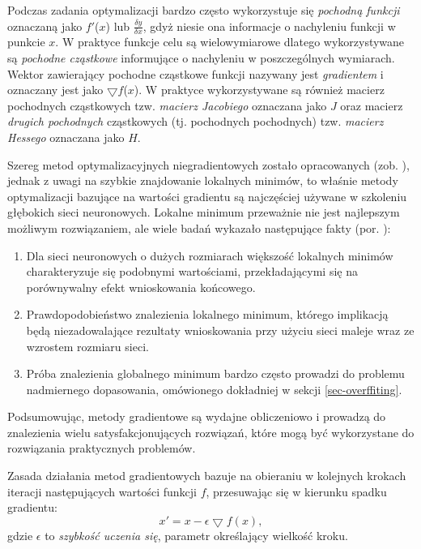 Podczas zadania optymalizacji bardzo często wykorzystuje się \textit{pochodną funkcji} oznaczaną jako $f'$($x$) lub $\frac{\delta y}{\delta x}$, gdyż niesie ona informacje o nachyleniu funkcji w punkcie $x$. W praktyce funkcje celu są wielowymiarowe dlatego wykorzystywane są \textit{pochodne cząstkowe} informujące o nachyleniu w poszczególnych wymiarach. Wektor zawierający pochodne cząstkowe funkcji nazywany jest \textit{gradientem} i oznaczany jest jako $\bigtriangledown f$($x$). W praktyce wykorzystywane są również macierz pochodnych cząstkowych tzw. \textit{macierz Jacobiego} oznaczana jako $J$ oraz macierz \textit{drugich pochodnych} cząstkowych (tj. pochodnych pochodnych) tzw. \textit{macierz Hessego} oznaczana jako $H$.

Szereg metod optymalizacyjnych niegradientowych zostało opracowanych (zob. \cite{DBLP:journals/corr/TaylorBXSPG16}), jednak z uwagi na szybkie znajdowanie lokalnych minimów, to właśnie metody optymalizacji bazujące na wartości gradientu są najczęściej używane w szkoleniu głębokich sieci neuronowych. Lokalne minimum przeważnie nie jest najlepszym możliwym rozwiązaniem, ale wiele badań wykazało następujące fakty (por. \cite{DBLP:journals/corr/ChoromanskaHMAL14}):
\begin{enumerate}
	\item Dla sieci neuronowych o dużych rozmiarach większość lokalnych minimów charakteryzuje się podobnymi wartościami, przekładającymi się na porównywalny efekt wnioskowania końcowego.
	\item Prawdopodobieństwo znalezienia lokalnego minimum, którego implikacją będą niezadowalające rezultaty wnioskowania przy użyciu sieci maleje wraz ze wzrostem rozmiaru sieci.
	\item Próba znalezienia globalnego minimum bardzo często prowadzi do problemu nadmiernego dopasowania, omówionego dokładniej w sekcji \ref{sec-overffiting}.
\end{enumerate}

Podsumowując, metody gradientowe są wydajne obliczeniowo i prowadzą do znalezienia wielu satysfakcjonujących rozwiązań, które mogą być wykorzystane do rozwiązania praktycznych problemów. 

Zasada działania metod gradientowych bazuje na obieraniu w kolejnych krokach iteracji następujących wartości funkcji $f$, przesuwając się w kierunku spadku gradientu:
\begin{equation}
x' = x - \epsilon \bigtriangledown f(x),
\end{equation} 
gdzie $\epsilon$ to \textit{szybkość uczenia się}, parametr określający wielkość kroku. 

